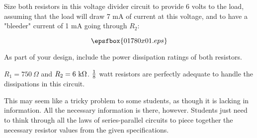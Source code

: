 

Size both resistors in this voltage divider circuit to provide 6 volts to the load, assuming that the load will draw 7 mA of current at this voltage, and to have a "bleeder" current of 1 mA going through $R_2$:

$$\epsfbox{01780x01.eps}$$

As part of your design, include the power dissipation ratings of both resistors.







$R_1 = 750 \> \Omega$ and $R_2 = 6 \hbox{ k}\Omega$.  $1 \over 8$ watt resistors are perfectly adequate to handle the dissipations in this circuit.







This may seem like a tricky problem to some students, as though it is lacking in information.  All the necessary information is there, however.  Students just need to think through all the laws of series-parallel circuits to piece together the necessary resistor values from the given specifications.




